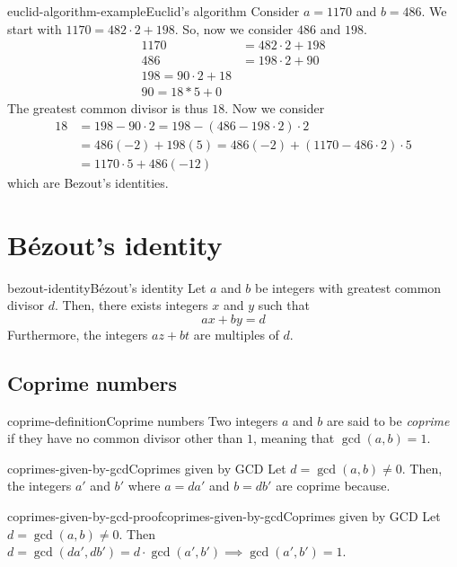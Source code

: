 \documentclass[preview]{standalone}
\begin{document}
\begin{snippetexample}{euclid-algorithm-example}{Euclid's algorithm}
    Consider \(a=1170\) and \(b=486\).
    We start with
    \(1170 = 482 \cdot 2 + 198\). So, now we consider \(486\) and \(198\).
    \begin{align*}
        1170 &= 482 \cdot 2 + 198 \\
        486 &= 198 \cdot 2 + 90 \\
        198 = 90 \cdot 2 + 18 \\
        90 = 18 * 5 + 0
    \end{align*}
    The greatest common divisor is thus \(18\).
    Now we consider
    \begin{align*}
        18 &= 198 - 90\cdot 2 = 198 - (486 - 198 \cdot 2)\cdot 2 \\
        &= 486(-2) + 198(5) = 486(-2) + (1170 - 486\cdot 2) \cdot 5 \\
        &= 1170 \cdot 5 + 486(-12)
    \end{align*}
    which are Bezout's identities.
\end{snippetexample}

\section{Bézout's identity}

\begin{snippettheorem}{bezout-identity}{Bézout's identity}
    Let \(a\) and \(b\) be integers with greatest common divisor \(d\).
    Then, there exists integers \(x\) and \(y\) such that
    \[
        ax+by=d
    \]
    Furthermore, the integers \(az+bt\) are multiples of \(d\).
\end{snippettheorem}


\subsection{Coprime numbers}

\begin{snippetdefinition}{coprime-definition}{Coprime numbers}
    Two integers \(a\) and \(b\) are said to be \textit{coprime}
    if they have no common divisor other than \(1\), meaning that \(\gcd(a,b)=1\).
\end{snippetdefinition}

\begin{snippetproposition}{coprimes-given-by-gcd}{Coprimes given by GCD}
    Let \(d = \gcd(a, b) \neq 0\). Then, the integers \(a'\) and \(b'\) where \(a = da'\) and \(b = db'\)
    are coprime because.
\end{snippetproposition}

\begin{snippetproof}{coprimes-given-by-gcd-proof}{coprimes-given-by-gcd}{Coprimes given by GCD}
    Let \(d = \gcd(a, b) \neq 0\). Then \(d = \gcd(da', db') = d\cdot \gcd(a', b') \implies \gcd(a', b') = 1\).
\end{snippetproof}


\end{document}
